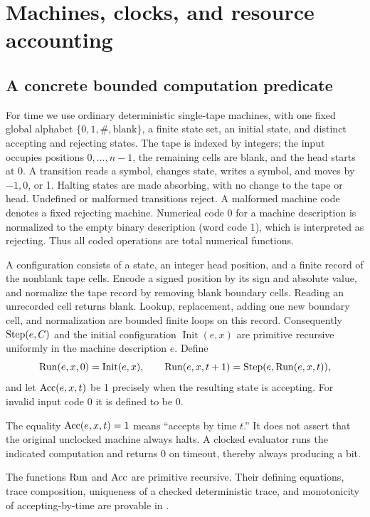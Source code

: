 \section{Machines, clocks, and resource accounting}
\label{sec:machines}

\subsection{A concrete bounded computation predicate}

For time we use ordinary deterministic single-tape machines, with one fixed
global alphabet \(\{0,1,\#,\mathrm{blank}\}\), a finite state set, an initial state,
and distinct accepting and rejecting states. The tape is indexed by integers;
the input occupies positions \(0,\ldots,n-1\), the remaining cells are blank,
and the head starts at 0. A transition reads a symbol, changes state, writes
a symbol, and moves by \(-1,0\), or 1. Halting states are made absorbing,
with no change to the tape or head. Undefined or malformed transitions reject.
A malformed machine code denotes a fixed rejecting machine. Numerical code
0 for a machine description is normalized to the empty binary description
(word code 1), which is interpreted as rejecting. Thus all coded
operations are total numerical functions.

A configuration consists of a state, an integer head position, and a finite
record of the nonblank tape cells. Encode a signed position by its sign and
absolute value, and normalize the tape record by removing blank boundary
cells. Reading an unrecorded cell returns blank. Lookup, replacement, adding
one new boundary cell, and normalization are bounded finite loops on this
record. Consequently \(\operatorname{Step}(e,C)\) and the initial configuration
\(\operatorname{Init}(e,x)\) are primitive recursive uniformly in the machine
description \(e\). Define
\[
 \operatorname{Run}(e,x,0)=\operatorname{Init}(e,x),\qquad
 \operatorname{Run}(e,x,t+1)=\operatorname{Step}(e,\operatorname{Run}(e,x,t)),
\]
and let \(\operatorname{Acc}(e,x,t)\) be 1 precisely when the resulting state is accepting.
For invalid input code 0 it is defined to be 0.

The equality \(\operatorname{Acc}(e,x,t)=1\) means ``accepts by time \(t\).'' It does not
assert that the original unclocked machine always halts. A clocked evaluator
runs the indicated computation and returns 0 on timeout, thereby always
producing a bit.

\begin{lemma}
\label{lem:boundedrun}
The functions \(\operatorname{Run}\) and \(\operatorname{Acc}\) are primitive recursive. Their defining
equations, trace composition, uniqueness of a checked deterministic trace,
and monotonicity of accepting-by-time are provable in \ipra.
\end{lemma}

